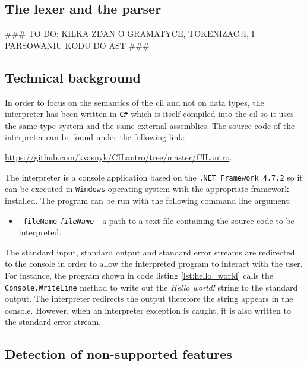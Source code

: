 \documentclass{article}
\numberwithin{equation}{section}
\begin{document}
\subsection{The lexer and the parser}

\#\#\# TO DO: KILKA ZDAN O GRAMATYCE, TOKENIZACJI, I PARSOWANIU KODU DO AST \#\#\#

\subsection{Technical background}

In order to focus on the semantics of the \acrshort{cil} and not on data types, the interpreter has been written in \texttt{C\#} which is itself compiled into the \acrshort{cil} so it uses the same type system and the same external assemblies. The source code of the interpreter can be found under the following link:

\begin{center}
	\href{https://github.com/kvasnyk/CILantro/tree/master/CILantro}{https://github.com/kvasnyk/CILantro/tree/master/CILantro}.
\end{center}

The interpreter is a console application based on the \texttt{.NET Framework 4.7.2} so it can be executed in \texttt{Windows} operating system with the appropriate framework installed. The program can be run with the following command line argument:
\begin{itemize}
	\item{\texttt{--fileName} \texttt{\textit{fileName}} - a path to a text file containing the source code to be interpreted.}
\end{itemize}

The standard input, standard output and standard error streams are redirected to the console in order to allow the interpreted program to interact with the user. For instance, the program shown in code listing \ref{lst:hello_world} calls the \texttt{Console.WriteLine} method to write out the \textit{Hello world!} string to the standard output. The interpreter redirects the output therefore the string appears in the console. However, when an interpreter exception is caught, it is also written to the standard error stream.

\subsection{Detection of non-supported features}
\end{document}
